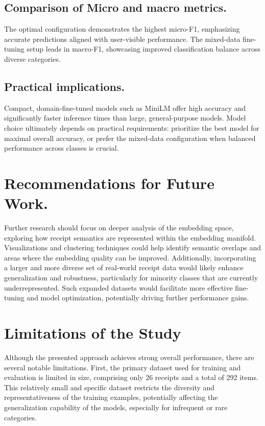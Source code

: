 \documentclass{SGGW-thesis-EN}
\begin{document}
\subsection{Comparison of Micro and macro metrics.} The optimal configuration demonstrates the 
highest micro-F1, emphasizing accurate predictions aligned with user-visible 
performance. The mixed-data fine-tuning setup leads in macro-F1, showcasing improved 
classification balance across diverse categories.

\subsection{Practical implications.} Compact, domain-fine-tuned models such as MiniLM 
offer high accuracy and significantly faster inference times than large, general-purpose 
models. Model choice ultimately depends on practical requirements: prioritize the best 
model for maximal overall accuracy, or prefer the mixed-data configuration when 
balanced performance across classes is crucial.


\section{Recommendations for Future Work.}
Further research should focus on deeper analysis of the embedding space, exploring how
receipt semantics are represented within the embedding manifold. Visualizations and clustering
techniques could help identify semantic overlaps and areas where the embedding quality can
be improved. Additionally, incorporating a larger and more diverse set of real-world receipt
data would likely enhance generalization and robustness, particularly for minority classes
that are currently underrepresented. Such expanded datasets would facilitate more
effective fine-tuning and model optimization, potentially driving further performance gains.

\section{Limitations of the Study}

Although the presented approach achieves strong overall performance, there are several notable limitations.  
First, the primary dataset used for training and evaluation is limited in size, comprising only 26 receipts and a total of 292 items.  
This relatively small and specific dataset restricts the diversity and representativeness of the training examples, potentially affecting the generalization capability of the models, especially for infrequent or rare categories.
\end{document}

